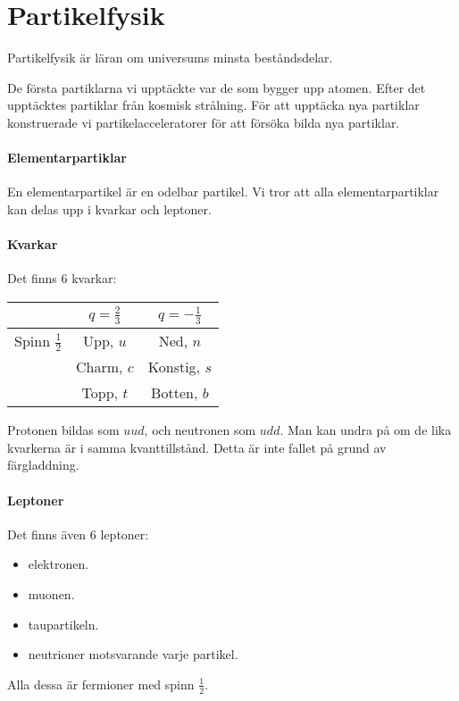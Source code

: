 \section{Partikelfysik}

Partikelfysik är läran om universums minsta beståndsdelar.

De första partiklarna vi upptäckte var de som bygger upp atomen. Efter det upptäcktes partiklar från kosmisk strålning. För att upptäcka nya partiklar konstruerade vi partikelacceleratorer för att försöka bilda nya partiklar.

\paragraph{Elementarpartiklar}
En elementarpartikel är en odelbar partikel. Vi tror att alla elementarpartiklar kan delas upp i kvarkar och leptoner.

\paragraph{Kvarkar}
Det finns $6$ kvarkar:
\begin{table}[!ht]
	\begin{tabular}{| c | c | c |}
		\hline
		                    & $q = \frac{2}{3}$ & $q = -\frac{1}{3}$ \\
		\hline
		Spinn $\frac{1}{2}$ & Upp, $u$          & Ned, $n$ \\
		\hline
		                    & Charm, $c$        & Konstig, $s$ \\
		\hline
		                    & Topp, $t$         & Botten, $b$ \\
		\hline
	\end{tabular}
\end{table}

Protonen bildas som $uud$, och neutronen som $udd$. Man kan undra på om de lika kvarkerna är i samma kvanttillstånd. Detta är inte fallet på grund av färgladdning.

\paragraph{Leptoner}
Det finns även $6$ leptoner:
\begin{itemize}
	\item elektronen.
	\item muonen.
	\item taupartikeln.
	\item neutrioner motsvarande varje partikel.
\end{itemize}
Alla dessa är fermioner med spinn $\frac{1}{2}$.

